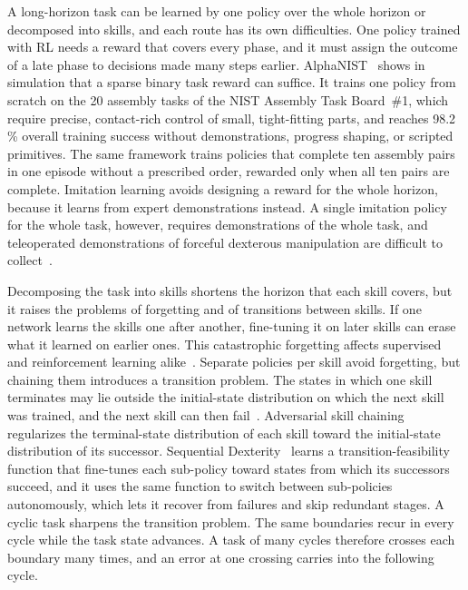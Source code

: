 A long-horizon task can be learned by one policy over the whole horizon or decomposed into skills, and each route has its own difficulties. One policy trained with \ac{RL} needs a reward that covers every phase, and it must assign the outcome of a late phase to decisions made many steps earlier. AlphaNIST~\cite{Zhang2026} shows in simulation that a sparse binary task reward can suffice. It trains one policy from scratch on the 20 assembly tasks of the NIST Assembly Task Board~\#1, which require precise, contact-rich control of small, tight-fitting parts, and reaches 98.2\,\% overall training success without demonstrations, progress shaping, or scripted primitives. The same framework trains policies that complete ten assembly pairs in one episode without a prescribed order, rewarded only when all ten pairs are complete. Imitation learning avoids designing a reward for the whole horizon, because it learns from expert demonstrations instead. A single imitation policy for the whole task, however, requires demonstrations of the whole task, and teleoperated demonstrations of forceful dexterous manipulation are difficult to collect~\cite{Kedia2026}.

Decomposing the task into skills shortens the horizon that each skill covers, but it raises the problems of forgetting and of transitions between skills. If one network learns the skills one after another, fine-tuning it on later skills can erase what it learned on earlier ones. This catastrophic forgetting affects supervised and reinforcement learning alike~\cite{Kirkpatrick2017}. Separate policies per skill avoid forgetting, but chaining them introduces a transition problem. The states in which one skill terminates may lie outside the initial-state distribution on which the next skill was trained, and the next skill can then fail~\cite{Lee2022}. Adversarial skill chaining~\cite{Lee2022} regularizes the terminal-state distribution of each skill toward the initial-state distribution of its successor. Sequential Dexterity~\cite{Chen2023} learns a transition-feasibility function that fine-tunes each sub-policy toward states from which its successors succeed, and it uses the same function to switch between sub-policies autonomously, which lets it recover from failures and skip redundant stages. A cyclic task sharpens the transition problem. The same boundaries recur in every cycle while the task state advances. A task of many cycles therefore crosses each boundary many times, and an error at one crossing carries into the following cycle.

